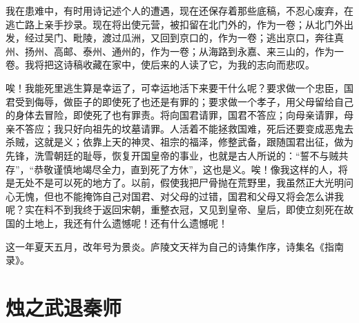\documentclass[12pt,UTF-8,openany,a4]{ctexbook}
\begin{document}
\begin{large}
    我在患难中，有时用诗记述个人的遭遇，现在还保存着那些底稿，不忍心废弃，在逃亡路上亲手抄录。现在将出使元营，被扣留在北门外的，作为一卷；从北门外出发，经过吴门、毗陵，渡过瓜洲，又回到京口的，作为一卷；逃出京口，奔往真州、扬州、高邮、泰州、通州的，作为一卷；从海路到永嘉、来三山的，作为一卷。我将把这诗稿收藏在家中，使后来的人读了它，为我的志向而悲叹。
    
    唉！我能死里逃生算是幸运了，可幸运地活下来要干什么呢？要求做一个忠臣，国君受到侮辱，做臣子的即使死了也还是有罪的；要求做一个孝子，用父母留给自己的身体去冒险，即使死了也有罪责。将向国君请罪，国君不答应；向母亲请罪，母亲不答应；我只好向祖先的坟墓请罪。人活着不能拯救国难，死后还要变成恶鬼去杀贼，这就是义；依靠上天的神灵、祖宗的福泽，修整武备，跟随国君出征，做为先锋，洗雪朝廷的耻辱，恢复开国皇帝的事业，也就是古人所说的：“誓不与贼共存”，“恭敬谨慎地竭尽全力，直到死了方休”，这也是义。唉！像我这样的人，将是无处不是可以死的地方了。以前，假使我把尸骨抛在荒野里，我虽然正大光明问心无愧，但也不能掩饰自己对国君、对父母的过错，国君和父母又将会怎么讲我呢？实在料不到我终于返回宋朝，重整衣冠，又见到皇帝、皇后，即使立刻死在故国的土地上，我还有什么遗憾呢！还有什么遗憾呢！
    
    这一年夏天五月，改年号为景炎。庐陵文天祥为自己的诗集作序，诗集名《指南录》。
    
\end{large}



\chapter{烛之武退秦师}
\end{document}
